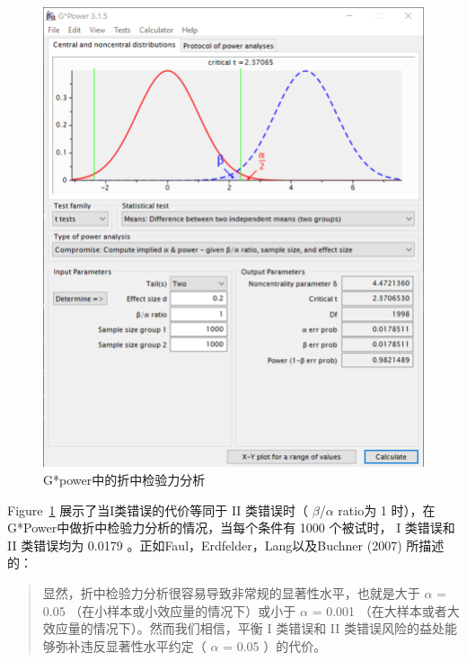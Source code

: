 \documentclass[
  letterpaper,
  DIV=11,
  numbers=noendperiod]{scrreprt}
\begin{document}
\begin{figure}

{\centering \includegraphics[width=1\textwidth,height=\textheight]{images/compromise1.png}

}

\caption{\label{fig-gpowcompromise}G*power中的折中检验力分析}

\end{figure}

Figure~\ref{fig-gpowcompromise} 展示了当I类错误的代价等同于 II
类错误时（ \(\beta\)/\(\alpha\) ratio为 1
时），在G*Power中做折中检验力分析的情况，当每个条件有 1000 个被试时， I
类错误和 II 类错误均为 0.0179 。正如Faul，Erdfelder，Lang以及Buchner
(2007) 所描述的：

\begin{quote}
显然，折中检验力分析很容易导致非常规的显著性水平，也就是大于 \(\alpha\)
= 0.05 （在小样本或小效应量的情况下）或小于 \(\alpha\) = 0.001
（在大样本或者大效应量的情况下）。然而我们相信，平衡 I 类错误和 II
类错误风险的益处能够弥补违反显著性水平约定（ \(\alpha\) = 0.05
）的代价。
\end{quote}
\end{document}
